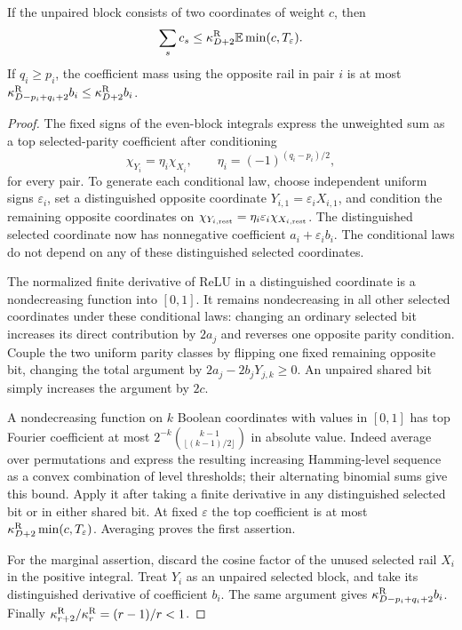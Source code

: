 \begin{lemma}\label{lem:random-min}
If the unpaired block consists of two coordinates of weight $c$, then
\[
 \sum_s c_s\le\kappa_{D+2}^{\rm R}\mathbb E\min(c,T_\varepsilon).
\]
If $q_i\ge p_i$, the coefficient mass using the opposite rail in
pair $i$ is at most
$\kappa_{D-p_i+q_i+2}^{\rm R}b_i\le\kappa_{D+2}^{\rm R}b_i$.
\end{lemma}
\begin{proof}
The fixed signs of the even-block integrals express the unweighted
sum as a top selected-parity coefficient after conditioning
\[
 \chi_{Y_i}=\eta_i\chi_{X_i},\qquad
 \eta_i=(-1)^{(q_i-p_i)/2},
\]
for every pair. To generate each conditional law, choose independent
uniform signs $\varepsilon_i$, set a distinguished opposite coordinate
$Y_{i,1}=\varepsilon_iX_{i,1}$, and condition the remaining opposite
coordinates on
$\chi_{Y_{i,\rm rest}}=\eta_i\varepsilon_i\chi_{X_{i,\rm rest}}$.
The distinguished selected coordinate now has nonnegative coefficient
$a_i+\varepsilon_i b_i$. The conditional laws do not depend on any
of these distinguished selected coordinates.

The normalized finite derivative of ReLU in a distinguished coordinate
is a nondecreasing function into $[0,1]$. It remains nondecreasing in
all other selected coordinates under these conditional laws: changing
an ordinary selected bit increases its direct contribution by $2a_j$
and reverses one opposite parity condition. Couple the two uniform
parity classes by flipping one fixed remaining opposite bit, changing
the total argument by $2a_j-2b_jY_{j,k}\ge0$.
An unpaired shared bit simply increases the argument by $2c$.

A nondecreasing function on $k$ Boolean coordinates with values in
$[0,1]$ has top Fourier coefficient at most
$2^{-k}\binom{k-1}{\lfloor(k-1)/2\rfloor}$ in absolute value.
Indeed average over permutations and express the resulting increasing
Hamming-level sequence as a convex combination of level thresholds;
their alternating binomial sums give this bound.
Apply it after taking a finite derivative in any distinguished selected
bit or in either shared bit. At fixed $\varepsilon$ the top coefficient
is at most $\kappa_{D+2}^{\rm R}\min(c,T_\varepsilon)$. Averaging
proves the first assertion.

For the marginal assertion, discard the cosine factor of the unused
selected rail $X_i$ in the positive integral. Treat $Y_i$ as an unpaired
selected block, and take its distinguished derivative of coefficient
$b_i$. The same argument gives
$\kappa_{D-p_i+q_i+2}^{\rm R}b_i$. Finally
$\kappa_{r+2}^{\rm R}/\kappa_r^{\rm R}=(r-1)/r<1$.
\end{proof}

